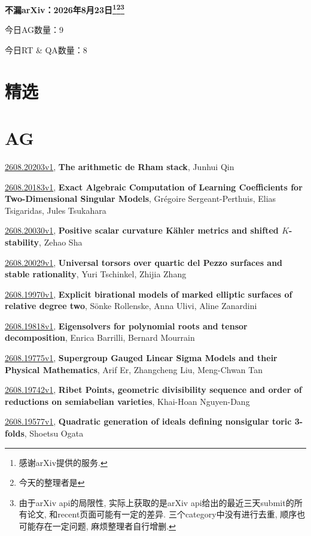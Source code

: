 \documentclass[9pt, a4paper]{article}
\theoremstyle{plain}
\theoremstyle{definition}
\theoremstyle{remark}
\newcommand{\arxiv}[3]{\href{https://arxiv.org/abs/#1}{#1}, \textbf{\textcolor{arxivblue}{#2}}, #3}
\newcommand{\AGnumber}{9}
\newcommand{\RTQAnumber}{8}
\newcommand{\NewestDate}{2026年8月23日}
\newcommand{\todayarXiver}{} %
\begin{document}
\begin{center}
    \Huge\textbf{不漏arXiv：\NewestDate\footnote{感谢arXiv提供的服务.}\footnote{今天的整理者是\todayarXiver}\footnote{由于arXiv api的局限性, 实际上获取的是arXiv api给出的最近三天submit的所有论文, 和recent页面可能有一定的差异. 三个category中没有进行去重, 顺序也可能存在一定问题, 麻烦整理者自行增删.}} \\
\end{center}

\setcounter{section}{-1}

\begin{center}
    今日AG数量：\AGnumber
    
    今日RT \& QA数量：\RTQAnumber
    
\end{center}


\section{精选}


\section{AG}
\arxiv{2608.20203v1}{The arithmetic de Rham stack}{Junhui Qin}

\arxiv{2608.20183v1}{Exact Algebraic Computation of Learning Coefficients for Two-Dimensional Singular Models}{Grégoire Sergeant-Perthuis, Elias Tsigaridas, Jules Tsukahara}

\arxiv{2608.20030v1}{Positive scalar curvature Kähler metrics and shifted $K$-stability}{Zehao Sha}

\arxiv{2608.20029v1}{Universal torsors over quartic del Pezzo surfaces and stable rationality}{Yuri Tschinkel, Zhijia Zhang}

\arxiv{2608.19970v1}{Explicit birational models of marked elliptic surfaces of relative degree two}{Sönke Rollenske, Anna Ulivi, Aline Zanardini}

\arxiv{2608.19818v1}{Eigensolvers for polynomial roots and tensor decomposition}{Enrica Barrilli, Bernard Mourrain}

\arxiv{2608.19775v1}{Supergroup Gauged Linear Sigma Models and their Physical Mathematics}{Arif Er, Zhangcheng Liu, Meng-Chwan Tan}

\arxiv{2608.19742v1}{Ribet Points, geometric divisibility sequence and order of reductions on semiabelian varieties}{Khai-Hoan Nguyen-Dang}

\arxiv{2608.19577v1}{Quadratic generation of ideals defining nonsigular toric 3-folds}{Shoetsu Ogata}
\end{document}
